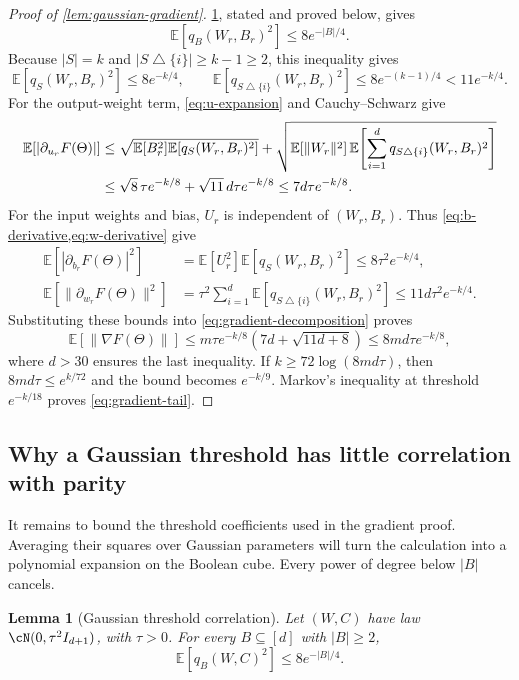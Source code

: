 \documentclass[11pt,twoside]{article}
\newcommand{\E}{\mathbb E}
\newtheorem{lemma}[theorem]{Lemma}
\theoremstyle{definition}
\theoremstyle{remark}
\begin{document}
\begin{proof}[Proof of \cref{lem:gaussian-gradient}]
\cref{lem:gaussian-threshold}, stated and proved below, gives
\[
\E[q_B(W_r,B_r)^2]\le8e^{-|B|/4}.
\]
Because $|S|=k$ and $|S\mathbin\triangle\{i\}|\ge k-1\ge2$, this inequality gives
\[
\E[q_S(W_r,B_r)^2]\le8e^{-k/4},
\qquad
\E[q_{S\mathbin\triangle\{i\}}(W_r,B_r)^2]
\le8e^{-(k-1)/4}<11e^{-k/4}.
\]
For the output-weight term, \cref{eq:u-expansion} and Cauchy--Schwarz give
\begin{align}
\E[|\partial_{u_r}F(\Theta)|]
&\le\sqrt{\E[B_r^2]\E[q_S(W_r,B_r)^2]}
+\sqrt{\E[\|W_r\|^2]\,
\E\!\left[\sum_{i=1}^dq_{S\mathbin\triangle\{i\}}(W_r,B_r)^2\right]}
\notag\\
&\le\sqrt8\,\tau e^{-k/8}+\sqrt{11}\,d\tau e^{-k/8}
\le7d\tau e^{-k/8}.
\label{eq:u-coordinate-bound}
\end{align}
For the input weights and bias, $U_r$ is independent of $(W_r,B_r)$.
Thus \cref{eq:b-derivative,eq:w-derivative} give
\begin{align}
\E[|\partial_{b_r}F(\Theta)|^2]
&=\E[U_r^2]\E[q_S(W_r,B_r)^2]
\le8\tau^2e^{-k/4},
\label{eq:b-coordinate-bound}\\
\E[\|\partial_{w_r}F(\Theta)\|^2]
&=\tau^2\sum_{i=1}^d
\E[q_{S\mathbin\triangle\{i\}}(W_r,B_r)^2]
\le11d\tau^2e^{-k/4}.
\label{eq:w-coordinate-bound}
\end{align}
Substituting these bounds into \cref{eq:gradient-decomposition} proves
\[
\E[\|\nabla F(\Theta)\|]
\le m\tau e^{-k/8}(7d+\sqrt{11d+8})
\le8md\tau e^{-k/8},
\]
where $d>30$ ensures the last inequality. If
$k\ge72\log(8md\tau)$, then $8md\tau\le e^{k/72}$ and the bound becomes
$e^{-k/9}$. Markov's inequality at threshold $e^{-k/18}$ proves
\cref{eq:gradient-tail}.
\end{proof}

\subsection{Why a Gaussian threshold has little correlation with parity}

It remains to bound the threshold coefficients used in the gradient proof.
Averaging their squares over Gaussian parameters will turn the calculation
into a polynomial expansion on the Boolean cube. Every power of degree below
$|B|$ cancels.

\begin{lemma}[Gaussian threshold correlation]
\label{lem:gaussian-threshold}
Let $(W,C)$ have law $\cN(0,\tau^2I_{d+1})$, with $\tau>0$.
For every $B\subseteq[d]$ with $|B|\ge2$,
\begin{equation}
\E[q_B(W,C)^2]\le8e^{-|B|/4}.
\label{eq:threshold-bound}
\end{equation}
\end{lemma}
\end{document}
